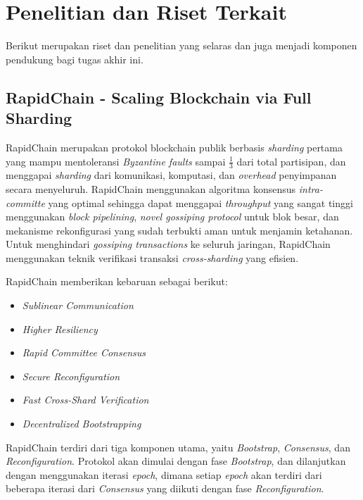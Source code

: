 \section{Penelitian dan Riset Terkait}
\label{sec:penelitian-riset-terkait}

Berikut merupakan riset dan penelitian yang selaras dan juga menjadi komponen pendukung bagi tugas akhir ini.

\subsection{RapidChain - Scaling Blockchain via Full Sharding}
\label{subsec:rapidchain}

RapidChain merupakan protokol blockchain publik berbasis \textit{sharding} pertama yang mampu mentoleransi \textit{Byzantine faults} sampai $\frac{1}{3}$ dari total partisipan, dan menggapai \textit{sharding} dari komunikasi, komputasi, dan \textit{overhead} penyimpanan secara menyeluruh. RapidChain menggunakan algoritma konsensus \textit{intra-committe} yang optimal sehingga dapat menggapai \textit{throughput} yang sangat tinggi menggunakan \textit{block pipelining}, \textit{novel gossiping protocol} untuk blok besar, dan mekanisme rekonfigurasi yang sudah terbukti aman untuk menjamin ketahanan. Untuk menghindari \textit{gossiping transactions} ke seluruh jaringan, RapidChain menggunakan teknik verifikasi transaksi \textit{cross-sharding} yang efisien.

RapidChain memberikan kebaruan sebagai berikut:

\begin{itemize}
  \item \textit{Sublinear Communication}
  \item \textit{Higher Resiliency}
  \item \textit{Rapid Committee Consensus}
  \item \textit{Secure Reconfiguration}
  \item \textit{Fast Cross-Shard Verification}
  \item \textit{Decentralized Bootstrapping}
\end{itemize}

RapidChain terdiri dari tiga komponen utama, yaitu \textit{Bootstrap}, \textit{Consensus}, dan \textit{Reconfiguration}. Protokol akan dimulai dengan fase \textit{Bootstrap}, dan dilanjutkan dengan menggunakan iterasi \textit{epoch}, dimana setiap \textit{epoch} akan terdiri dari beberapa iterasi dari \textit{Consensus} yang diikuti dengan fase \textit{Reconfiguration}.

